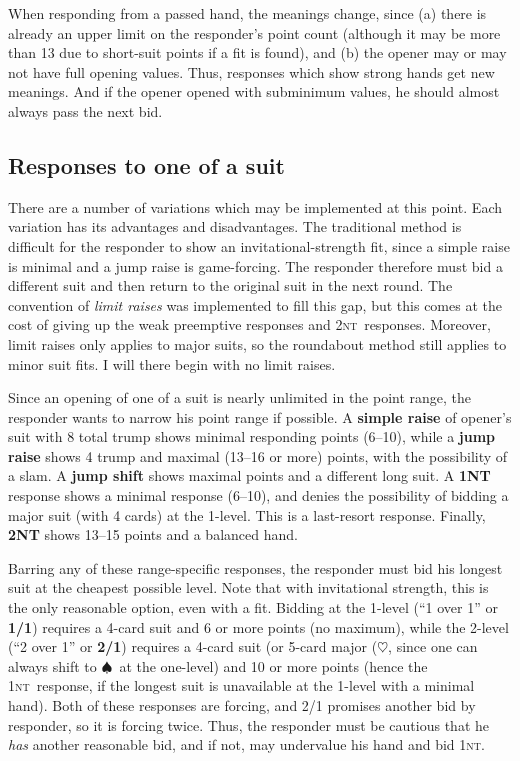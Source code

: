 \documentclass[11pt]{article}
\def\H{$\heartsuit$}
\def\S{$\spadesuit$}
\def\NT{\textsc{nt}}
\begin{document}
When responding from a passed hand, the meanings change, since (a) there
is already an upper limit on the responder's point count (although it
may be more than 13 due to short-suit points if a fit is found), and
(b) the opener may or may not have full opening values.  Thus, responses
which show strong hands get new meanings.  And if the opener opened
with subminimum values, he should almost always pass the next bid.

\subsection{Responses to one of a suit}
There are a number of variations which may be implemented at this
point.  Each variation has its advantages and disadvantages.  The
traditional method is difficult for the responder to show an
invitational-strength fit, since a simple raise is minimal and a jump
raise is game-forcing.  The responder therefore must bid a different
suit and then return to the original suit in the next round.  The
convention of \emph{limit raises} was implemented to fill this gap,
but this comes at the cost of giving up the weak preemptive responses
and 2\NT\ responses.  Moreover, limit raises only applies to major
suits, so the roundabout method still applies to minor suit fits.  I
will there begin with no limit raises.

Since an opening of one of a suit is nearly unlimited in the point
range, the responder wants to narrow his point range if possible.  A
\textbf{simple raise} of opener's suit with 8 total trump shows
minimal responding points (6--10), while a \textbf{jump raise} shows 4
trump and maximal (13--16 or more) points, with the possibility of a
slam.  A \textbf{jump shift} shows maximal points and a different long
suit.  A \textbf{1NT} response shows a minimal response (6--10), and 
denies the possibility of bidding a major suit (with 4 cards) at the
1-level.  This is a last-resort response.  Finally, \textbf{2NT} shows
13--15 points and a balanced hand.

Barring any of these range-specific responses, the responder must bid
his longest suit at the cheapest possible level.  Note that with
invitational strength, this is the only reasonable option, even with a
fit.  Bidding at the 1-level (``1 over 1'' or \textbf{1/1}) requires a
4-card suit and 6 or more points (no maximum), while the 2-level (``2
over 1'' or \textbf{2/1}) requires a 4-card suit (or 5-card major (\H,
since one can always shift to \S\ at the one-level) and 10 or more
points (hence the 1\NT\ response, if the longest suit is unavailable
at the 1-level with a minimal hand).  Both of these responses are
forcing, and 2/1 promises another bid by responder, so it is forcing
twice.  Thus, the responder must be cautious that he \emph{has}
another reasonable bid, and if not, may undervalue his hand and bid
1\NT.
\end{document}
